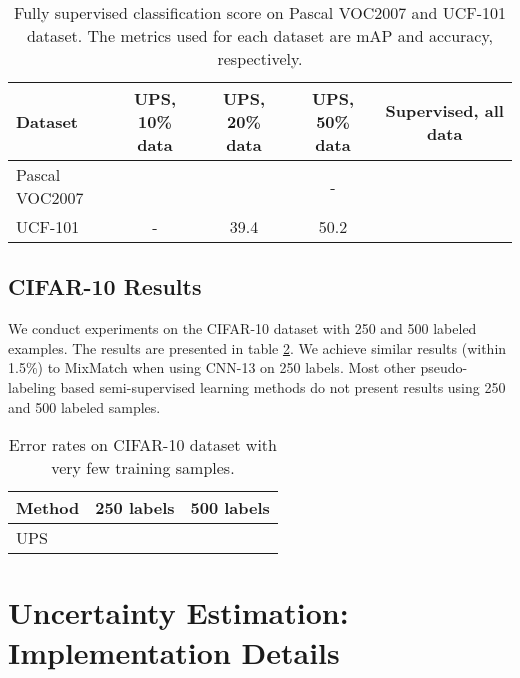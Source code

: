 \documentclass{article} \usepackage{iclr2021_conference,times}
\begin{document}
\begin{table}[h]
\caption{Fully supervised classification score on Pascal VOC2007 and UCF-101 dataset. The metrics used for each dataset are mAP and accuracy, respectively.}
\begin{center}
\label{tab:supervised}
\small
\begin{tabular}{l|c|c|c|c}
\hline
Dataset & UPS, 10\% data & UPS, 20\% data & UPS, 50\% data & Supervised, all data \\ \hline
Pascal VOC2007 &  &  & - &   \\ 
UCF-101 & - & 39.4 & 50.2 &  \\ \hline
\end{tabular}
\end{center}
\end{table}

\subsection{CIFAR-10 Results}
We conduct experiments on the CIFAR-10 dataset with 250 and 500 labeled examples. The results are presented in table \ref{tab:250_500}. We achieve similar results (within 1.5\%) to MixMatch \citep{NIPS2019_8749_MixMatch} when using CNN-13 on 250 labels. Most other pseudo-labeling based semi-supervised learning methods do not present results using 250 and 500 labeled samples.



\begin{table}[h]
\caption{Error rates on CIFAR-10 dataset with very few training samples. }
\begin{center}
\label{tab:250_500}
\small
\begin{tabular}{l|cc}
\hline
Method & 250 labels & 500 labels \\ \hline
UPS &  &  \\ \hline
\end{tabular}
\end{center}
\end{table}


\section{Uncertainty Estimation: Implementation Details}
\label{sec:uncertaintyest}
\end{document}
